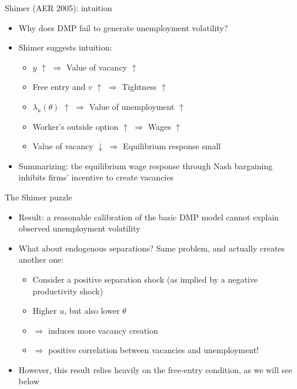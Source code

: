 \documentclass[9pt]{beamer}
\newcommand{\bit}{\begin{itemize}}
\newcommand{\eit}{\end{itemize}}
\begin{document}
\begin{frame}{Shimer (AER 2005): intuition}

\bit
\setlength\itemsep{2em}

\item Why does DMP fail to generate unemployment volatility?

\item Shimer suggests intuition:
\bit
\setlength\itemsep{1em}

\item $y$ $\uparrow$ $\Rightarrow$ Value of vacancy $\uparrow$

\item Free entry and $v$ $\uparrow$ $\Rightarrow$ Tightness $\uparrow$

\item $\lambda_u(\theta)$ $\uparrow$ $\Rightarrow$ Value of unemployment $\uparrow$

\item Worker's outside option $\uparrow$ $\Rightarrow$ Wages $\uparrow$ 

\item Value of vacancy $\downarrow$ $\Rightarrow$ Equilibrium response small

\eit

\item Summarizing: the equilibrium wage response through Nash bargaining inhibits firms' incentive to create vacancies

\eit
\end{frame}



\begin{frame}{The Shimer puzzle}

\bit
\setlength\itemsep{1.5em}

\item Result: a reasonable calibration of the basic DMP model cannot explain observed unemployment volatility

\item What about endogenous separations? Same problem, and actually creates another one:
\bit
\setlength\itemsep{0.5em}
	\item Consider a positive separation shock (as implied by a negative productivity shock)

	\item Higher $u$, but also lower $\theta$ 
	
	\item $\Rightarrow$ induces more vacancy creation
	
	\item $\Rightarrow$ positive correlation between vacancies and unemployment!
\eit

\item However, this result relies heavily on the free-entry condition, as we will see below

\eit

\end{frame}
\end{document}
